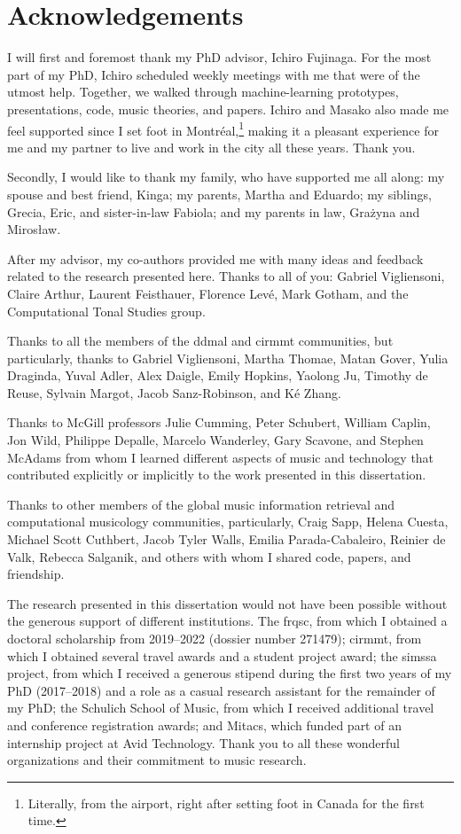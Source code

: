 \chapter*{Acknowledgements}
\label{chap:acknowledgements}

I will first and foremost thank my PhD advisor, Ichiro
Fujinaga. For the most part of my PhD, Ichiro scheduled
weekly meetings with me that were of the utmost help.
Together, we walked through machine-learning prototypes,
presentations, code, music theories, and papers. Ichiro and
Masako also made me feel supported since I set foot in
Montr\'eal,\footnote{Literally, from the airport, right
after setting foot in Canada for the first time.} making it
a pleasant experience for me and my partner to live and work
in the city all these years. Thank you.

Secondly, I would like to thank my family, who have
supported me all along: my spouse and best friend, Kinga; my
parents, Martha and Eduardo; my siblings, Grecia, Eric, and
sister-in-law Fabiola; and my parents in law, Gra\.zyna and
Miros\l{}aw.

After my advisor, my co-authors provided me with many ideas
and feedback related to the research presented here. Thanks
to all of you: Gabriel Vigliensoni, Claire Arthur, Laurent
Feisthauer, Florence Lev\'e, Mark Gotham, and the
Computational Tonal Studies group.

Thanks to all the members of the \gls{ddmal} and
\gls{cirmmt} communities, but particularly, thanks to
Gabriel Vigliensoni, Martha Thomae, Matan Gover, Yulia
Draginda, Yuval Adler, Alex Daigle, Emily Hopkins, Yaolong
Ju, Timothy de Reuse, Sylvain Margot, Jacob Sanz-Robinson,
and K\'e Zhang.

Thanks to McGill professors Julie Cumming, Peter Schubert,
William Caplin, Jon Wild, Philippe Depalle, Marcelo
Wanderley, Gary Scavone, and Stephen McAdams from whom I
learned different aspects of music and technology that
contributed explicitly or implicitly to the work presented
in this dissertation.

Thanks to other members of the global music information
retrieval and computational musicology communities,
particularly, Craig Sapp, Helena Cuesta, Michael Scott
Cuthbert, Jacob Tyler Walls, Emilia Parada-Cabaleiro,
Reinier de Valk, Rebecca Salganik, and others with whom I
shared code, papers, and friendship.

The research presented in this dissertation would not have
been possible without the generous support of different
institutions. The \gls{frqsc}, from which I obtained a
doctoral scholarship from 2019--2022 (dossier number
271479); \gls{cirmmt}, from which I obtained several travel
awards and a student project award; the \gls{simssa}
project, from which I received a generous stipend during the
first two years of my PhD (2017--2018) and a role as a
casual research assistant for the remainder of my PhD; the
Schulich School of Music, from which I received additional
travel and conference registration awards; and Mitacs, which
funded part of an internship project at Avid Technology.
Thank you to all these wonderful organizations and their
commitment to music research.

